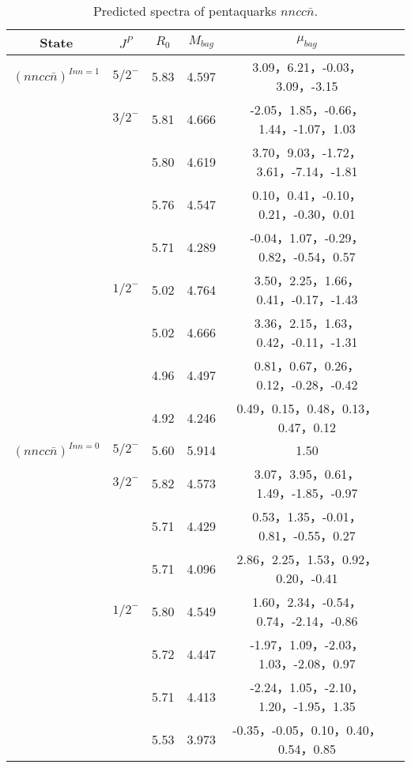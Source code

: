 \documentclass[prd,twocolumn,floatfix,nofootinbib]{revtex4}
\begin{document}
\begin{table*}[!htbp]
    \caption{Predicted spectra of pentaquarks $nncc\bar{n}$.}
    \begin{tabular}{cccccc}
        \hline\hline
        {\rm State} &$J^{P}$ &$R_{0}$ &$M_{bag}$ &$\mu_{bag}$  \\ \hline
        ${(nncc\bar{n})}^{I{nn}=1}$
            &${5/2}^{-}$     &5.83   &4.597 &3.09，6.21，-0.03，3.09，-3.15  \\                
            &${3/2}^{-}$     &5.81   &4.666 &-2.05，1.85，-0.66，1.44，-1.07，1.03 \\
                         &$ $     &5.80   &4.619 &3.70，9.03，-1.72，3.61，-7.14，-1.81  \\
                         &$ $     &5.76   &4.547 &0.10，0.41，-0.10，0.21，-0.30，0.01  \\
                         &$ $     &5.71   &4.289 &-0.04，1.07，-0.29，0.82，-0.54，0.57 \\
            &${1/2}^{-}$     &5.02   &4.764 &3.50，2.25，1.66，0.41，-0.17，-1.43  \\
                         &$ $     &5.02   &4.666 &3.36，2.15，1.63，0.42，-0.11，-1.31  \\
                         &$ $     &4.96   &4.497 &0.81，0.67，0.26，0.12，-0.28，-0.42  \\
                         &$ $     &4.92   &4.246 &0.49，0.15，0.48，0.13，0.47，0.12 \\
            ${(nncc\bar{n})}^{I{nn}=0}$
            &${5/2}^{-}$     &5.60   &5.914 &1.50  \\                
            &${3/2}^{-}$     &5.82   &4.573 &3.07，3.95，0.61，1.49，-1.85，-0.97 \\
                         &$ $     &5.71   &4.429 &0.53，1.35，-0.01，0.81，-0.55，0.27  \\
                         &$ $     &5.71   &4.096 &2.86，2.25，1.53，0.92，0.20，-0.41  \\
            &${1/2}^{-}$     &5.80   &4.549 &1.60，2.34，-0.54，0.74，-2.14，-0.86  \\
                         &$ $     &5.72   &4.447 &-1.97，1.09，-2.03，1.03，-2.08，0.97  \\
                         &$ $     &5.71   &4.413 &-2.24，1.05，-2.10，1.20，-1.95，1.35  \\
                         &$ $     &5.53   &3.973 &-0.35，-0.05，0.10，0.40，0.54，0.85 \\
       \hline\hline
    \end{tabular}
\end{table*}
\end{document}
